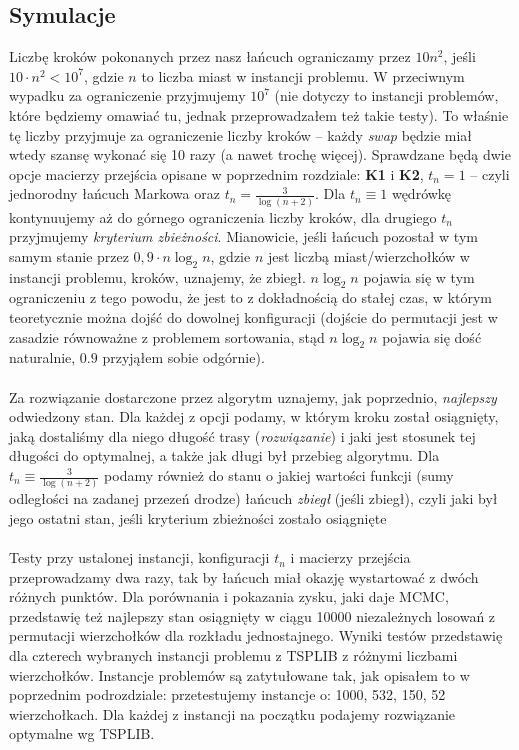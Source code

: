 \documentclass[a4paper]{article}
\theoremstyle{defn}
\theoremstyle{theorem}
\theoremstyle{lemma}
\theoremstyle{cor}
\theoremstyle{fact}
\begin{document}
\subsection{Symulacje}
\label{sect5.5}
Liczbę kroków pokonanych przez nasz łańcuch ograniczamy przez $10n^2$, jeśli $10\cdot n^2 < 10^7$, gdzie $n$ to liczba miast w instancji problemu. W przeciwnym wypadku za ograniczenie przyjmujemy $10^7$ (nie dotyczy to instancji problemów, które będziemy omawiać tu, jednak przeprowadzałem też takie testy). To właśnie tę liczby przyjmuje za ograniczenie liczby kroków – każdy \textit{swap} będzie miał wtedy szansę wykonać się 10 razy (a nawet trochę więcej). Sprawdzane będą dwie opcje macierzy przejścia opisane w poprzednim rozdziale: \textbf{K1} i \textbf{K2}, $t_n = 1$ – czyli jednorodny łańcuch Markowa oraz $t_n = \frac{3}{\log(n+2)}$. Dla $t_n \equiv 1$ wędrówkę kontynuujemy aż do górnego ograniczenia liczby kroków, dla drugiego $t_n$ przyjmujemy \textit{kryterium zbieżności}. Mianowicie, jeśli łańcuch pozostał w tym samym stanie przez $0,9 \cdot n\log_2 n$, gdzie $n$ jest liczbą miast/wierzchołków w instancji problemu, kroków, uznajemy, że zbiegł. $n\log_2 n$ pojawia się w tym ograniczeniu z tego powodu, że jest to z dokładnością do stałej czas, w którym teoretycznie można dojść do dowolnej konfiguracji (dojście do permutacji jest w zasadzie równoważne z problemem sortowania, stąd $n\log_2 n$ pojawia się dość naturalnie, $0.9$ przyjąłem sobie odgórnie).\\\\
Za rozwiązanie dostarczone przez algorytm uznajemy, jak poprzednio, \textit{najlepszy} odwiedzony stan. Dla każdej z opcji podamy, w którym kroku został osiągnięty, jaką dostaliśmy dla niego długość trasy (\textit{rozwiązanie}) i jaki jest stosunek tej długości do optymalnej, a także jak długi był przebieg algorytmu. Dla $t_n \equiv \frac{3}{\log(n+2)}$ podamy również do stanu o jakiej wartości funkcji (sumy odległości na zadanej przezeń drodze) łańcuch \textit{zbiegł} (jeśli zbiegł), czyli jaki był jego ostatni stan, jeśli kryterium zbieżności zostało osiągnięte\\\\
Testy przy ustalonej instancji, konfiguracji $t_n$ i macierzy przejścia przeprowadzamy dwa razy, tak by łańcuch miał okazję wystartować z dwóch różnych punktów. Dla porównania i pokazania zysku, jaki daje MCMC, przedstawię też najlepszy stan osiągnięty w ciągu 10000 niezależnych losowań z permutacji wierzchołków dla rozkładu jednostajnego.  Wyniki testów przedstawię dla czterech wybranych instancji problemu z TSPLIB \cite{benchmark} z różnymi liczbami wierzchołków. Instancje problemów są zatytułowane tak, jak opisałem to w poprzednim podrozdziale: przetestujemy instancje o: 1000, 532, 150, 52 wierzchołkach. Dla każdej z instancji na początku podajemy rozwiązanie optymalne wg TSPLIB.
\end{document}
